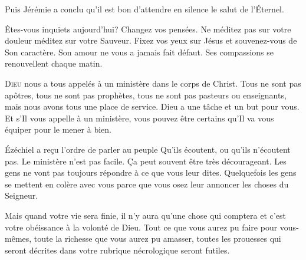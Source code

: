 Puis Jérémie a conclu qu'il est bon \Og d'attendre en silence
 le salut de l'Éternel. \Fg{}

Êtes-vous inquiets aujourd'hui? Changez vos pensées.
 Ne méditez pas sur votre douleur \ocadr méditez sur votre Sauveur.
 Fixez vos yeux sur Jésus et souvenez-vous de Son caractère.
 Son amour ne vous a jamais fait défaut.
 Ses compassions se renouvellent chaque matin. 

\dvrule








\lettrine{D}{ieu} nous a tous appelés à un ministère
 dans le corps de Christ. Tous ne sont pas apôtres,
 tous ne sont pas prophètes, tous ne sont pas pasteurs ou enseignants,
 mais nous avons tous une place de service.
 Dieu a une tâche et un but pour vous.
 Et s'Il vous appelle à un ministère, vous pouvez être certains
 qu'Il va vous équiper pour le mener à bien. 


Ézéchiel a re\c{c}u l'ordre de parler au peuple\frcolon{} 
 \Og Qu'ils écoutent, ou qu'ils n'écoutent pas. \Fg{}
 Le ministère n'est pas facile. Ça peut souvent être très décourageant.
 Les gens ne vont pas toujours répondre à ce que vous leur dites.
 Quelquefois les gens se mettent en colère avec vous parce que vous osez
 leur annoncer les choses du Seigneur. 

Mais quand votre vie sera finie, il n'y aura qu'une chose qui comptera 
 \ocadr et c'est votre obéissance à la volonté de Dieu.
 Tout ce que vous aurez pu faire pour vous-mêmes, toute la richesse
 que vous aurez pu amasser, toutes les prouesses qui seront décrites
 dans votre rubrique nécrologique seront futiles. 

